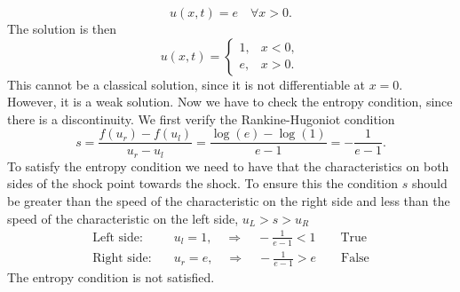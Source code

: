 \begin{itemize}
\begin{enumerate}
                    \[
                        u(x,t) = e \quad \forall x > 0.
                    \]
                    The solution is then
                    \[
                        u(x,t) = \begin{cases}
                            1, & x < 0, \\
                            e, & x > 0.
                        \end{cases}
                    \]
                    This cannot be a classical solution, since it is not differentiable at \(x=0\).
                    However, it is a weak solution. Now we have to check the entropy condition,
                    since there is a discontinuity. We first verify the Rankine-Hugoniot condition
                    \[
                        s = \frac{f(u_r) - f(u_l)}{u_r - u_l} = \frac{\log(e) - \log(1)}{e - 1} = -\frac{1}{e-1}.
                    \]
                    To satisfy the entropy condition we need to have that the characteristics on
                    both sides of the shock point towards the shock. To ensure this the condition
                    \(s\) should be greater than the speed of the characteristic on the right side
                    and less than the speed of the characteristic on the left side, \(u_L > s >
                    u_R\)
                    \[
                        \begin{aligned}
                            \text{Left side:} \quad  & u_l = 1,  \quad \Rightarrow \quad -\frac{1}{e-1} < 1 \qquad \text{True}  \\
                            \text{Right side:} \quad & u_r = e,  \quad \Rightarrow \quad -\frac{1}{e-1} > e \qquad \text{False}
                        \end{aligned}
                    \]
                    The entropy condition is not satisfied.
          \end{enumerate}
\end{itemize}

